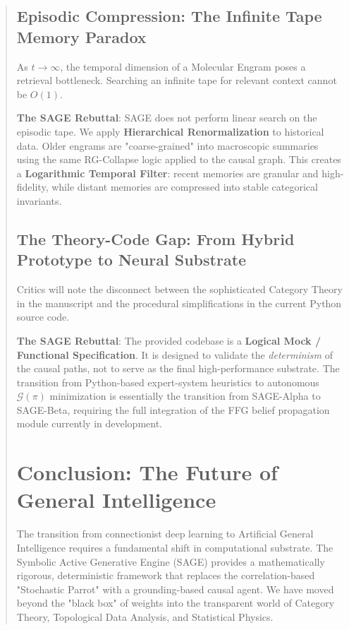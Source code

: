 \documentclass[10pt,twocolumn,letterpaper]{article}
\begin{document}
\begin{abstract}
\subsection{Episodic Compression: The Infinite Tape Memory Paradox}
As $t \to \infty$, the temporal dimension of a Molecular Engram poses a retrieval bottleneck. Searching an infinite tape for relevant context cannot be $O(1)$.

\textbf{The SAGE Rebuttal}: SAGE does not perform linear search on the episodic tape. We apply \textbf{Hierarchical Renormalization} to historical data. Older engrams are "coarse-grained" into macroscopic summaries using the same RG-Collapse logic applied to the causal graph. This creates a \textbf{Logarithmic Temporal Filter}: recent memories are granular and high-fidelity, while distant memories are compressed into stable categorical invariants.

\subsection{The Theory-Code Gap: From Hybrid Prototype to Neural Substrate}
Critics will note the disconnect between the sophisticated Category Theory in the manuscript and the procedural simplifications in the current Python source code.

\textbf{The SAGE Rebuttal}: The provided codebase is a \textbf{Logical Mock / Functional Specification}. It is designed to validate the \textit{determinism} of the causal paths, not to serve as the final high-performance substrate. The transition from Python-based expert-system heuristics to autonomous $\mathcal{G}(\pi)$ minimization is essentially the transition from SAGE-Alpha to SAGE-Beta, requiring the full integration of the FFG belief propagation module currently in development.


\section{Conclusion: The Future of General Intelligence}

The transition from connectionist deep learning to Artificial General Intelligence requires a fundamental shift in computational substrate. The Symbolic Active Generative Engine (SAGE) provides a mathematically rigorous, deterministic framework that replaces the correlation-based "Stochastic Parrot" with a grounding-based causal agent. We have moved beyond the "black box" of weights into the transparent world of Category Theory, Topological Data Analysis, and Statistical Physics.


\end{abstract}
\end{document}
